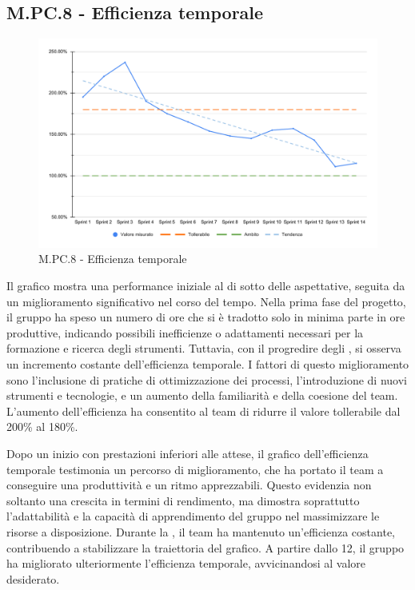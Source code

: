\subsection{M.PC.8 - Efficienza temporale}
\begin{figure}[H]
    \centering
    \includegraphics[width=\textwidth]{assets/efficienza_temporale.pdf}
    \caption{M.PC.8 - Efficienza temporale}
\end{figure}

\par Il grafico mostra una performance iniziale al di sotto delle aspettative, seguita da un miglioramento significativo nel corso del tempo. Nella prima fase del progetto, il gruppo ha speso un numero di ore che si è tradotto solo in minima parte in ore produttive, indicando possibili inefficienze o adattamenti necessari per la formazione e ricerca degli strumenti. Tuttavia, con il progredire degli , si osserva un incremento costante dell'efficienza temporale. I fattori di questo miglioramento sono l'inclusione di pratiche di ottimizzazione dei processi, l'introduzione di nuovi strumenti e tecnologie, e un aumento della familiarità e della coesione del team. L'aumento dell'efficienza ha consentito al team di ridurre il valore tollerabile dal 200\% al 180\%.

\par Dopo un inizio con prestazioni inferiori alle attese, il grafico dell'efficienza temporale testimonia un percorso di miglioramento, che ha portato il team a conseguire una produttività e un ritmo apprezzabili. Questo evidenzia non soltanto una crescita in termini di rendimento, ma dimostra soprattutto l'adattabilità e la capacità di apprendimento del gruppo nel massimizzare le risorse a disposizione. Durante la , il team ha mantenuto un'efficienza costante, contribuendo a stabilizzare la traiettoria del grafico. A partire dallo  12, il gruppo ha migliorato ulteriormente l'efficienza temporale, avvicinandosi al valore desiderato.
